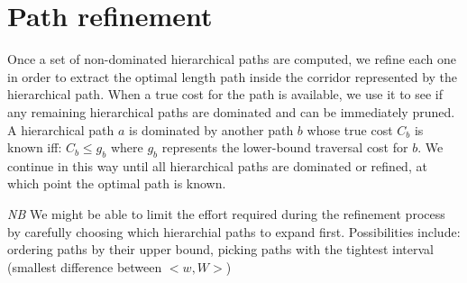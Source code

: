 \section{Path refinement}
\label{ia-sec:refinement}
Once a set of non-dominated hierarchical paths are computed, we refine each one in order to extract the optimal length path inside the corridor represented by the hierarchical path.
When a true cost for the path is available, we use it to see if any remaining hierarchical paths are dominated and can be immediately pruned.
A hierarchical path $a$ is dominated by another path $b$ whose true cost $C_{b}$ is known iff: $C_{b} \leq g_{b}$ where $g_{b}$ represents the lower-bound traversal cost for $b$.
We continue in this way until all hierarchical paths are dominated or refined, at which point the optimal path is known.

\emph{NB} We might be able to limit the effort required during the refinement process by carefully choosing which hierarchial paths to expand first. Possibilities include: ordering paths by their upper bound, picking paths with the tightest interval (smallest difference between $<w, W>$)
